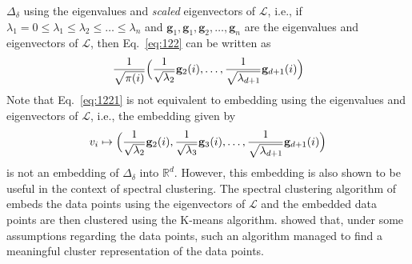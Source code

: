 $\Delta_\delta$ using the eigenvalues and \emph{scaled} eigenvectors
of $\bm{\mathcal{L}}$, i.e., if $\lambda_1 = 0 \leq \lambda_1 \leq
\lambda_2 \leq \dots \leq \lambda_n$ and $\mathbf{g}_1, \mathbf{g}_1,
\mathbf{g}_2, \dots, \mathbf{g}_n$ are the eigenvalues and
eigenvectors of $\bm{\mathcal{L}}$, then Eq.~\eqref{eq:122} can be
written as
\begin{equation}
  \label{eq:1221}
  \frac{1}{\sqrt{\pi(i)}}\Bigl(\frac{1}{\sqrt{\lambda_2}} \mathbf{g}_2(i),
  \dots, \frac{1}{\sqrt{\lambda_{d+1}}} \mathbf{g}_{d+1}(i)\Bigr)
\end{equation}
Note that Eq.~\eqref{eq:1221} is not equivalent to embedding
using the eigenvalues and eigenvectors of $\bm{\mathcal{L}}$, i.e.,
the embedding given by
\begin{equation}
  \label{eq:102}
  v_i \mapsto \Bigl( \frac{1}{\sqrt{\lambda_2}} \mathbf{g}_2(i),
  \frac{1}{\sqrt{\lambda_3}}\mathbf{g}_3(i), \dots, \frac{1}{\sqrt{\lambda_{d+1}}} \mathbf{g}_{d+1}(i) \Bigr)
\end{equation}
is not an embedding
of $\Delta_{\delta}$ into $\mathbb{R}^{d}$. However, this embedding is
also shown to be useful in the context of spectral clustering. The
spectral clustering algorithm of \citet{ng02} embeds the data points
using the eigenvectors of $\bm{\mathcal{L}}$ and the embedded data
points are then clustered using the K-means algorithm. \citet{ng02}
showed that, under some assumptions regarding the data points, such an
algorithm managed to find a meaningful cluster representation of the
data points.
%

